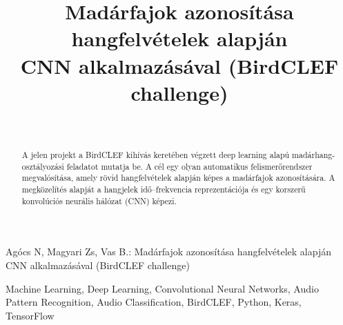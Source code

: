 \documentclass[journal]{IEEEtran}
\begin{document}
\title{Madárfajok azonosítása hangfelvételek alapján\\CNN alkalmazásával (BirdCLEF challenge)}

\author{
  \\[0.5em]
}

%
{Agócs N, Magyari Zs, Vas B.: Madárfajok azonosítása hangfelvételek alapján CNN alkalmazásával (BirdCLEF challenge)}

\maketitle

\begin{abstract}
  A jelen projekt a BirdCLEF kihívás keretében végzett deep learning alapú madárhang-osztályozási feladatot mutatja be. A cél egy olyan automatikus felismerőrendszer megvalósítása, amely rövid hangfelvételek alapján képes a madárfajok azonosítására. A megközelítés alapját a hangjelek idő--frekvencia reprezentációja és egy korszerű konvolúciós neurális hálózat (CNN) képezi.
\end{abstract}

\begin{IEEEkeywords}
  Machine Learning, Deep Learning, Convolutional Neural Networks, Audio Pattern Recognition, Audio Classification, BirdCLEF, Python, Keras, TensorFlow
\end{IEEEkeywords}



\end{document}
